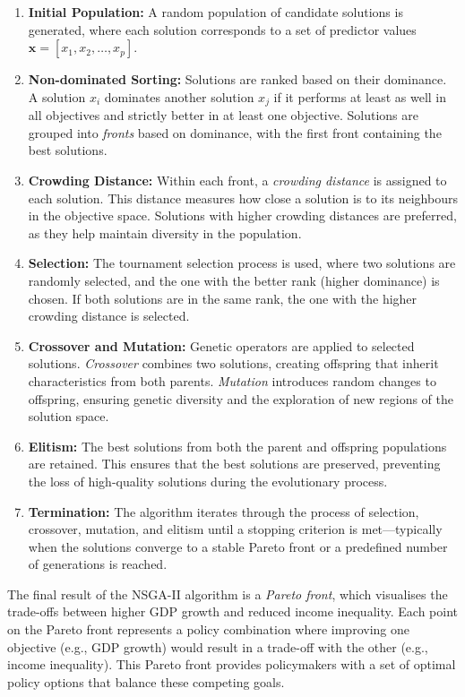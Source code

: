 \documentclass[12pt]{article}
\begin{document}
\begin{enumerate}
    \item \textbf{Initial Population:} A random population of candidate solutions is generated, where each solution corresponds to a set of predictor values \( \mathbf{x} = [x_1, x_2, \dots, x_p] \).
    \item \textbf{Non-dominated Sorting:} Solutions are ranked based on their dominance. A solution \(x_i\) dominates another solution \(x_j\) if it performs at least as well in all objectives and strictly better in at least one objective. Solutions are grouped into \textit{fronts} based on dominance, with the first front containing the best solutions.
    \item \textbf{Crowding Distance:} Within each front, a \textit{crowding distance} is assigned to each solution. This distance measures how close a solution is to its neighbours in the objective space. Solutions with higher crowding distances are preferred, as they help maintain diversity in the population.
    \item \textbf{Selection:} The tournament selection process is used, where two solutions are randomly selected, and the one with the better rank (higher dominance) is chosen. If both solutions are in the same rank, the one with the higher crowding distance is selected.
    \item \textbf{Crossover and Mutation:} Genetic operators are applied to selected solutions. \textit{Crossover} combines two solutions, creating offspring that inherit characteristics from both parents. \textit{Mutation} introduces random changes to offspring, ensuring genetic diversity and the exploration of new regions of the solution space.
    \item \textbf{Elitism:} The best solutions from both the parent and offspring populations are retained. This ensures that the best solutions are preserved, preventing the loss of high-quality solutions during the evolutionary process.
    \item \textbf{Termination:} The algorithm iterates through the process of selection, crossover, mutation, and elitism until a stopping criterion is met—typically when the solutions converge to a stable Pareto front or a predefined number of generations is reached.
\end{enumerate}

The final result of the NSGA-II algorithm is a \textit{Pareto front}, which visualises the trade-offs between higher GDP growth and reduced income inequality. Each point on the Pareto front represents a policy combination where improving one objective (e.g., GDP growth) would result in a trade-off with the other (e.g., income inequality). This Pareto front provides policymakers with a set of optimal policy options that balance these competing goals.
\end{document}
